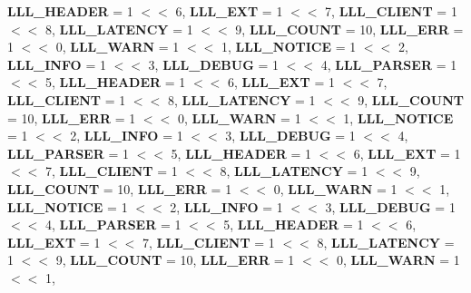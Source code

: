 \begin{DoxyCompactItemize}
{\bfseries L\+L\+L\+\_\+\+H\+E\+A\+D\+ER} = 1 $<$$<$ 6, 
\newline
{\bfseries L\+L\+L\+\_\+\+E\+XT} = 1 $<$$<$ 7, 
{\bfseries L\+L\+L\+\_\+\+C\+L\+I\+E\+NT} = 1 $<$$<$ 8, 
{\bfseries L\+L\+L\+\_\+\+L\+A\+T\+E\+N\+CY} = 1 $<$$<$ 9, 
{\bfseries L\+L\+L\+\_\+\+C\+O\+U\+NT} = 10, 
\newline
{\bfseries L\+L\+L\+\_\+\+E\+RR} = 1 $<$$<$ 0, 
{\bfseries L\+L\+L\+\_\+\+W\+A\+RN} = 1 $<$$<$ 1, 
{\bfseries L\+L\+L\+\_\+\+N\+O\+T\+I\+CE} = 1 $<$$<$ 2, 
{\bfseries L\+L\+L\+\_\+\+I\+N\+FO} = 1 $<$$<$ 3, 
\newline
{\bfseries L\+L\+L\+\_\+\+D\+E\+B\+UG} = 1 $<$$<$ 4, 
{\bfseries L\+L\+L\+\_\+\+P\+A\+R\+S\+ER} = 1 $<$$<$ 5, 
{\bfseries L\+L\+L\+\_\+\+H\+E\+A\+D\+ER} = 1 $<$$<$ 6, 
{\bfseries L\+L\+L\+\_\+\+E\+XT} = 1 $<$$<$ 7, 
\newline
{\bfseries L\+L\+L\+\_\+\+C\+L\+I\+E\+NT} = 1 $<$$<$ 8, 
{\bfseries L\+L\+L\+\_\+\+L\+A\+T\+E\+N\+CY} = 1 $<$$<$ 9, 
{\bfseries L\+L\+L\+\_\+\+C\+O\+U\+NT} = 10, 
{\bfseries L\+L\+L\+\_\+\+E\+RR} = 1 $<$$<$ 0, 
\newline
{\bfseries L\+L\+L\+\_\+\+W\+A\+RN} = 1 $<$$<$ 1, 
{\bfseries L\+L\+L\+\_\+\+N\+O\+T\+I\+CE} = 1 $<$$<$ 2, 
{\bfseries L\+L\+L\+\_\+\+I\+N\+FO} = 1 $<$$<$ 3, 
{\bfseries L\+L\+L\+\_\+\+D\+E\+B\+UG} = 1 $<$$<$ 4, 
\newline
{\bfseries L\+L\+L\+\_\+\+P\+A\+R\+S\+ER} = 1 $<$$<$ 5, 
{\bfseries L\+L\+L\+\_\+\+H\+E\+A\+D\+ER} = 1 $<$$<$ 6, 
{\bfseries L\+L\+L\+\_\+\+E\+XT} = 1 $<$$<$ 7, 
{\bfseries L\+L\+L\+\_\+\+C\+L\+I\+E\+NT} = 1 $<$$<$ 8, 
\newline
{\bfseries L\+L\+L\+\_\+\+L\+A\+T\+E\+N\+CY} = 1 $<$$<$ 9, 
{\bfseries L\+L\+L\+\_\+\+C\+O\+U\+NT} = 10, 
{\bfseries L\+L\+L\+\_\+\+E\+RR} = 1 $<$$<$ 0, 
{\bfseries L\+L\+L\+\_\+\+W\+A\+RN} = 1 $<$$<$ 1, 
\newline
{\bfseries L\+L\+L\+\_\+\+N\+O\+T\+I\+CE} = 1 $<$$<$ 2, 
{\bfseries L\+L\+L\+\_\+\+I\+N\+FO} = 1 $<$$<$ 3, 
{\bfseries L\+L\+L\+\_\+\+D\+E\+B\+UG} = 1 $<$$<$ 4, 
{\bfseries L\+L\+L\+\_\+\+P\+A\+R\+S\+ER} = 1 $<$$<$ 5, 
\newline
{\bfseries L\+L\+L\+\_\+\+H\+E\+A\+D\+ER} = 1 $<$$<$ 6, 
{\bfseries L\+L\+L\+\_\+\+E\+XT} = 1 $<$$<$ 7, 
{\bfseries L\+L\+L\+\_\+\+C\+L\+I\+E\+NT} = 1 $<$$<$ 8, 
{\bfseries L\+L\+L\+\_\+\+L\+A\+T\+E\+N\+CY} = 1 $<$$<$ 9, 
\newline
{\bfseries L\+L\+L\+\_\+\+C\+O\+U\+NT} = 10, 
{\bfseries L\+L\+L\+\_\+\+E\+RR} = 1 $<$$<$ 0, 
{\bfseries L\+L\+L\+\_\+\+W\+A\+RN} = 1 $<$$<$ 1, 

\end{DoxyCompactItemize}
